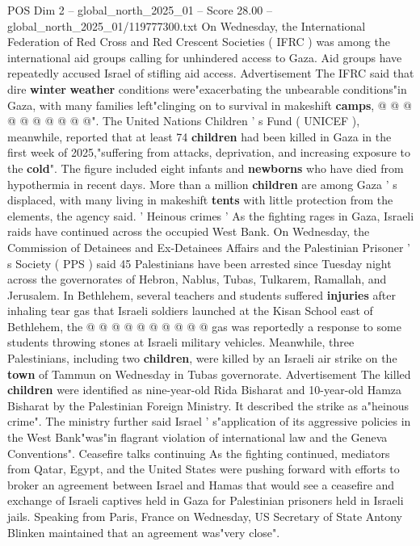 \begin{textsample}{POS Dim 2 – global\_north\_2025\_01 – Score 28.00 – global\_north\_2025\_01/119777300.txt}
On Wednesday, the International Federation of Red Cross and Red Crescent Societies ( IFRC ) was among the international aid groups calling for unhindered access to Gaza.
Aid groups have repeatedly accused Israel of stifling aid access.
Advertisement The IFRC said that dire \textbf{winter} \textbf{weather} conditions were"exacerbating the unbearable conditions"in Gaza, with many families left"clinging on to survival in makeshift \textbf{camps}, @ @ @ @ @ @ @ @ @ @".
The United Nations Children ' s Fund ( UNICEF ), meanwhile, reported that at least 74 \textbf{children} had been killed in Gaza in the first week of 2025,"suffering from attacks, deprivation, and increasing exposure to the \textbf{cold}".
The figure included eight infants and \textbf{newborns} who have died from hypothermia in recent days.
More than a million \textbf{children} are among Gaza ' s displaced, with many living in makeshift \textbf{tents} with little protection from the elements, the agency said. ' Heinous crimes ' As the fighting rages in Gaza, Israeli raids have continued across the occupied West Bank.
On Wednesday, the Commission of Detainees and Ex-Detainees Affairs and the Palestinian Prisoner ' s Society ( PPS ) said 45 Palestinians have been arrested since Tuesday night across the governorates of Hebron, Nablus, Tubas, Tulkarem, Ramallah, and Jerusalem.
In Bethlehem, several teachers and students suffered \textbf{injuries} after inhaling tear gas that Israeli soldiers launched at the Kisan School east of Bethlehem, the @ @ @ @ @ @ @ @ @ @ gas was reportedly a response to some students throwing stones at Israeli military vehicles.
Meanwhile, three Palestinians, including two \textbf{children}, were killed by an Israeli air strike on the \textbf{town} of Tammun on Wednesday in Tubas governorate.
Advertisement The killed \textbf{children} were identified as nine-year-old Rida Bisharat and 10-year-old Hamza Bisharat by the Palestinian Foreign Ministry.
It described the strike as a"heinous crime".
The ministry further said Israel ' s"application of its aggressive policies in the West Bank"was"in flagrant violation of international law and the Geneva Conventions".
Ceasefire talks continuing As the fighting continued, mediators from Qatar, Egypt, and the United States were pushing forward with efforts to broker an agreement between Israel and Hamas that would see a ceasefire and exchange of Israeli captives held in Gaza for Palestinian prisoners held in Israeli jails.
Speaking from Paris, France on Wednesday, US Secretary of State Antony Blinken maintained that an agreement was"very close".

\end{textsample}
